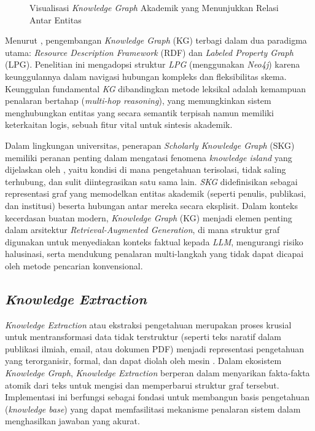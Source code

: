 \begin{figure}[htbp]
{
    }
    \caption{Visualisasi \textit{Knowledge Graph} Akademik yang Menunjukkan Relasi Antar Entitas}
    \label{fig:simple-kg}
\end{figure}

Menurut \citet{Hofer_2024}, pengembangan \textit{Knowledge Graph} (KG) terbagi dalam dua paradigma utama: \textit{Resource Description Framework} (RDF) dan \textit{Labeled Property Graph} (LPG). Penelitian ini mengadopsi struktur \textit{LPG} (menggunakan \textit{Neo4j}) karena keunggulannya dalam navigasi hubungan kompleks dan fleksibilitas skema. Keunggulan fundamental \textit{KG} dibandingkan metode leksikal adalah kemampuan penalaran bertahap (\textit{multi-hop reasoning}), yang memungkinkan sistem menghubungkan entitas yang secara semantik terpisah namun memiliki keterkaitan logis, sebuah fitur vital untuk sintesis akademik.

Dalam lingkungan universitas, penerapan \textit{Scholarly Knowledge Graph} (SKG) memiliki peranan penting dalam mengatasi fenomena \textit{knowledge island} yang dijelaskan oleh \cite{YU201748}, yaitu kondisi di mana pengetahuan terisolasi, tidak saling terhubung, dan sulit diintegrasikan satu sama lain. \textit{SKG} didefinisikan sebagai representasi graf yang memodelkan entitas akademik (seperti penulis, publikasi, dan institusi) beserta hubungan antar mereka secara eksplisit. Dalam konteks kecerdasan buatan modern, \textit{Knowledge Graph} (KG) menjadi elemen penting dalam arsitektur \textit{Retrieval-Augmented Generation}, di mana struktur graf digunakan untuk menyediakan konteks faktual kepada \textit{LLM}, mengurangi risiko halusinasi, serta mendukung penalaran multi-langkah yang tidak dapat dicapai oleh metode pencarian konvensional.

\subsection{\textit{Knowledge Extraction}}
\textit{Knowledge Extraction} atau ekstraksi pengetahuan merupakan proses krusial untuk mentransformasi data tidak terstruktur (seperti teks naratif dalam publikasi ilmiah, email, atau dokumen PDF) menjadi representasi pengetahuan yang terorganisir, formal, dan dapat diolah oleh mesin \citep{WANG2018112}. Dalam ekosistem \textit{Knowledge Graph}, \textit{Knowledge Extraction} berperan dalam menyarikan fakta-fakta atomik dari teks untuk mengisi dan memperbarui struktur graf tersebut. Implementasi ini berfungsi sebagai fondasi untuk membangun basis pengetahuan (\textit{knowledge base}) yang dapat memfasilitasi mekanisme penalaran sistem dalam menghasilkan jawaban yang akurat.

